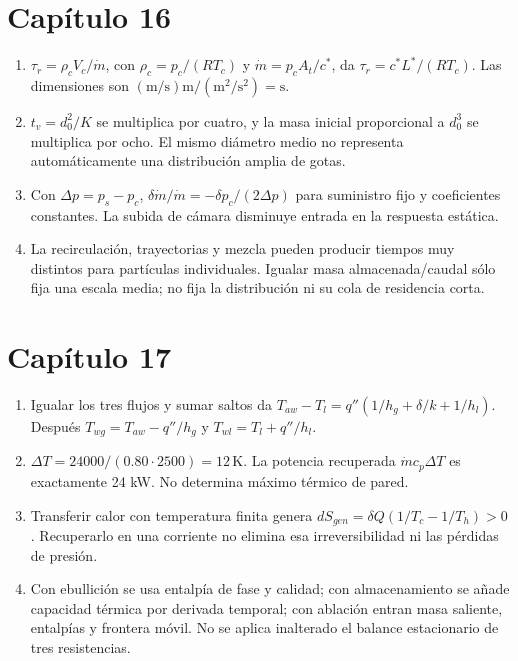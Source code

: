 \section*{Capítulo 16}
\begin{enumerate}
\item $\tau_r=\rho_cV_c/\dot m$, con $\rho_c=p_c/(RT_c)$ y $\dot m=p_cA_t/c^*$, da $\tau_r=c^*L^*/(RT_c)$. Las dimensiones son $(\mathrm{m/s})\mathrm m/(\mathrm{m^2/s^2})=\mathrm s$.
\item $t_v=d_0^2/K$ se multiplica por cuatro, y la masa inicial proporcional a $d_0^3$ se multiplica por ocho. El mismo diámetro medio no representa automáticamente una distribución amplia de gotas.
\item Con $\Delta p=p_s-p_c$, $\delta\dot m/\dot m=-\delta p_c/(2\Delta p)$ para suministro fijo y coeficientes constantes. La subida de cámara disminuye entrada en la respuesta estática.
\item La recirculación, trayectorias y mezcla pueden producir tiempos muy distintos para partículas individuales. Igualar masa almacenada/caudal sólo fija una escala media; no fija la distribución ni su cola de residencia corta.
\end{enumerate}
\section*{Capítulo 17}
\begin{enumerate}
\item Igualar los tres flujos y sumar saltos da $T_{aw}-T_l=q''(1/h_g+\delta/k+1/h_l)$. Después $T_{wg}=T_{aw}-q''/h_g$ y $T_{wl}=T_l+q''/h_l$.
\item $\Delta T=24000/(0.80\cdot2500)=12\,\mathrm K$. La potencia recuperada $\dot mc_p\Delta T$ es exactamente 24 kW. No determina máximo térmico de pared.
\item Transferir calor con temperatura finita genera $dS_{gen}=\delta Q(1/T_c-1/T_h)>0$. Recuperarlo en una corriente no elimina esa irreversibilidad ni las pérdidas de presión.
\item Con ebullición se usa entalpía de fase y calidad; con almacenamiento se añade capacidad térmica por derivada temporal; con ablación entran masa saliente, entalpías y frontera móvil. No se aplica inalterado el balance estacionario de tres resistencias.
\end{enumerate}
